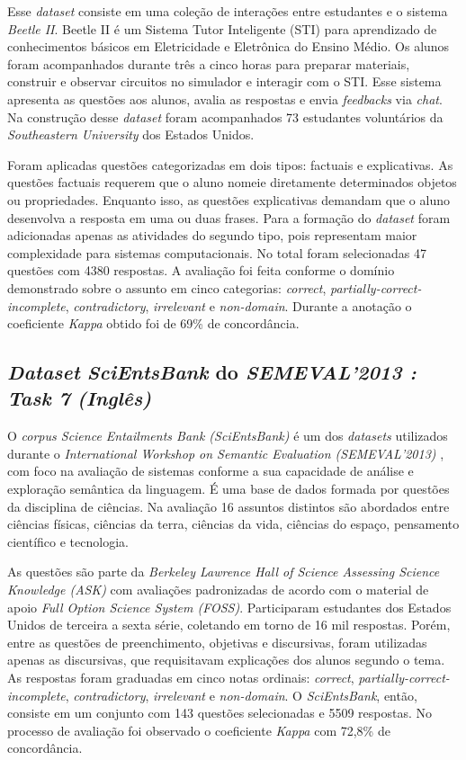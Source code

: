 Esse \textit{dataset} consiste em uma coleção de interações entre estudantes e o sistema \textit{Beetle II}. Beetle II é um Sistema Tutor Inteligente (STI) para aprendizado de conhecimentos básicos em Eletricidade e Eletrônica do Ensino Médio. Os alunos foram acompanhados durante três a cinco horas para preparar materiais, construir e observar circuitos no simulador e interagir com o STI. Esse sistema apresenta as questões aos alunos, avalia as respostas e envia \textit{feedbacks} via \textit{chat}. Na construção desse \textit{dataset} foram acompanhados 73 estudantes voluntários da \textit{Southeastern University} dos Estados Unidos.

Foram aplicadas questões categorizadas em dois tipos: factuais e explicativas. As questões factuais requerem que o aluno nomeie diretamente determinados objetos ou propriedades. Enquanto isso, as questões explicativas demandam que o aluno desenvolva a resposta em uma ou duas frases. Para a formação do \textit{dataset} foram adicionadas apenas as atividades do segundo tipo, pois representam maior complexidade para sistemas computacionais. No total foram selecionadas 47 questões com 4380 respostas. A avaliação foi feita conforme o domínio demonstrado sobre o assunto em cinco categorias: \textit{correct}, \textit{partially-correct-incomplete}, \textit{contradictory}, \textit{irrelevant} e \textit{non-domain}. Durante a anotação o coeficiente \textit{Kappa} obtido foi de 69\% de concordância.


\subsection{\textit{Dataset} \textit{SciEntsBank} do \textit{SEMEVAL'2013 : Task 7} \textit{(Inglês)}}
\label{scientsbank-db}

O \textit{corpus Science Entailments Bank (SciEntsBank)} \cite{dzikovska2012} é um dos \textit{datasets} utilizados durante o \textit{International Workshop on Semantic Evaluation (SEMEVAL'2013)} \cite{dzikovska2013}, com foco na avaliação de sistemas conforme a sua capacidade de análise e exploração semântica da linguagem. É uma base de dados formada por questões da disciplina de ciências. Na avaliação 16 assuntos distintos são abordados entre ciências físicas, ciências da terra, ciências da vida, ciências do espaço, pensamento científico e tecnologia. 

As questões são parte da \textit{Berkeley Lawrence Hall of Science Assessing Science Knowledge (ASK)} com avaliações padronizadas de acordo com o material de apoio \textit{Full Option Science System (FOSS)}. Participaram estudantes dos Estados Unidos de terceira a sexta série, coletando em torno de 16 mil respostas. Porém, entre as questões de preenchimento, objetivas e discursivas, foram utilizadas apenas as discursivas, que requisitavam explicações dos alunos segundo o tema. As respostas foram graduadas em cinco notas ordinais: \textit{correct}, \textit{partially-correct-incomplete}, \textit{contradictory}, \textit{irrelevant} e \textit{non-domain}. O \textit{SciEntsBank}, então, consiste em um conjunto com 143 questões selecionadas e 5509 respostas. No processo de avaliação foi observado o coeficiente \textit{Kappa} com 72,8\% de concordância.

